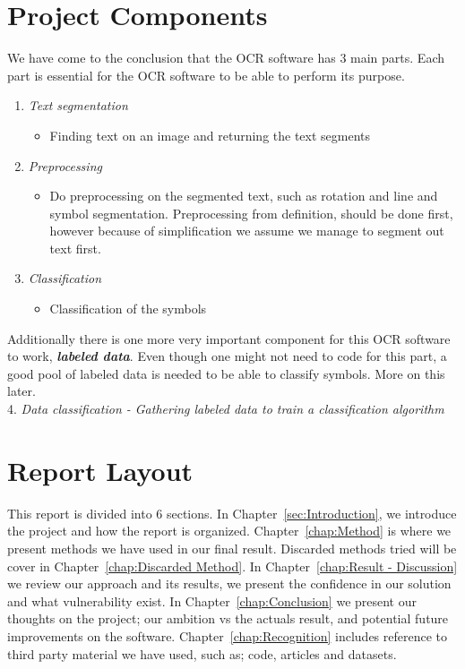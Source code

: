 \documentclass[Report.tex]{subfiles}
\begin{document}
\section{Project Components}
We have come to the conclusion that the OCR software has 3 main parts. Each
part is essential for the OCR software to be able to perform its purpose.
\begin{enumerate}
 \item{\textit{Text segmentation}}
 \begin{itemize}
  \item{Finding text on an image and returning the text segments}
 \end{itemize}
 \item{\textit{Preprocessing}}
 \begin{itemize}
  \item{Do preprocessing on the segmented text, such as rotation and line and
  symbol segmentation. Preprocessing from definition, should be done first,
  however because of simplification we assume we manage to segment out text
  first.}
 \end{itemize}
 \item{\textit{Classification}}
 \begin{itemize}
  \item{Classification of the symbols}
 \end{itemize}
\end{enumerate}

\begin{flushleft}
  Additionally there is one more very important component for this
  OCR software to work, \textit{\textbf{labeled data}}. Even though one might not
  need to code for this part, a good pool of labeled data is needed to be able to
  classify symbols. More on this later. \\
  4. \textit{Data classification - Gathering labeled data to train a classification algorithm}
\end{flushleft}


\section{Report Layout}
\label{subsec:Report Layout}
This report is divided into 6 sections. In
Chapter~\ref{sec:Introduction}, we introduce the project and how the report
is organized. Chapter~\ref{chap:Method} is where we present methods we have
used in our final result. Discarded methods tried will be cover in Chapter~\ref{chap:Discarded Method}.
In Chapter~\ref{chap:Result - Discussion} we review our approach and
its results, we present the confidence in our solution and what vulnerability
exist. In Chapter~\ref{chap:Conclusion} we present our thoughts on the project;
our ambition vs the actuals result, and potential future improvements on the software. Chapter~\ref{chap:Recognition} includes reference to third party
material we have used, such as; code, articles and datasets.
\end{document}
